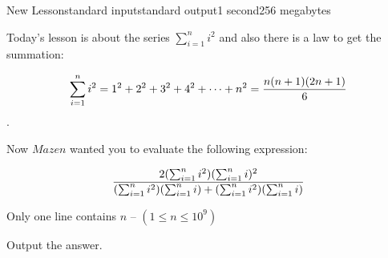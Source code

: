 \begin{problem}{New Lesson}{standard input}{standard output}{1 second}{256 megabytes}

Today's lesson is about the series ${\sum_{i = 1}^n i^2}$
and also there is a law to get the summation:

$${\sum_{i = 1}^n i^2} = 1^2 + 2^2 + 3^2 + 4^2 + \cdots + n^2 = \large\frac{n (n + 1) (2 n+1)} {6}$$.

Now $Mazen$ wanted you to evaluate the following expression:

$$\huge\frac{2({\sum_{i = 1}^n i^2})({\sum_{i = 1}^n i})^2}
{({\sum_{i = 1}^n i^2})({\sum_{i = 1}^n i}) + ({\sum_{i = 1}^n i^2})({\sum_{i = 1}^n i})} $$

\InputFile
Only one line contains $n$ -- $(1\le n \le 10^9)$

\OutputFile
Output the answer.

\Example

\begin{example}
%
\end{example}

\end{problem}

